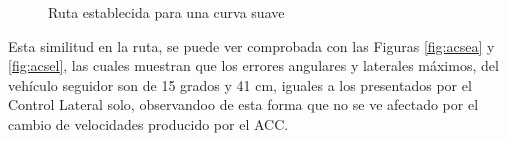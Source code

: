 \begin{figure}[H]
 \centering
 \caption{Ruta establecida para una curva suave}
 \label{fig:arcs}
\end{figure}

\par Esta similitud en la ruta, se puede ver comprobada con las Figuras \ref{fig:acsea} y \ref{fig:acsel}, las cuales muestran que los errores angulares y laterales máximos, del vehículo seguidor son de 15 grados y 41 cm, iguales a los presentados por el Control Lateral solo, observandoo de esta forma que no se ve afectado por el cambio de velocidades producido por el ACC.\\

